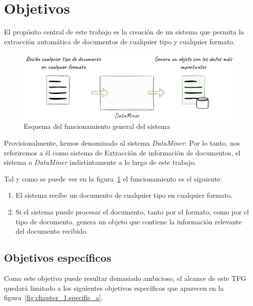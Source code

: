 \section{Objetivos}\label{sec:objetives}

El propósito central de este trabajo es la creación de un sistema que permita la extracción automática de documentos
de cualquier tipo y cualquier formato.

\begin{figure}[ht]
    \begin{center}
        \includegraphics[width=\textwidth]{./chapter/1/images/chapter_1.overview}
        \caption{Esquema del funcionamiento general del sistema}
        \label{fig:chapter_1.overview}
    \end{center}
\end{figure}

Provisionalmente, hemos denominado al sistema \textit{DataMiner}.
Por lo tanto, nos referiremos a él como sistema de Extracción de información de documentos, el sistema o
\textit{DataMiner} indistintamente a lo largo de este trabajo.

Tal y como se puede ver en la figura~\ref{fig:chapter_1.overview} el funcionamiento es el siguiente:

\begin{enumerate}
    \item El sistema recibe un documento de cualquier tipo en cualquier formato.
    \item
    Si el sistema puede procesar el documento, tanto por el formato, como por el tipo de documento, genera un objeto que
    contiene la información relevante del documento recibido.
\end{enumerate}

\subsection*{Objetivos específicos}

Como este objetivo puede resultar demasiado ambicioso, el alcance de este TFG quedará limitado a los siguientes
objetivos específicos que aparecen en la figura~\ref{fig:chapter_1.specific_a}.


